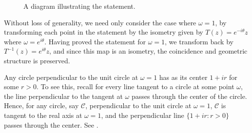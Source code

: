 \documentclass{homework}
\begin{document}
\begin{solution}
\begin{figure}[H]
\begin{center}
\end{center}
\caption{A diagram illustrating the statement.} \label{geometry_problem}
\end{figure}
\renewcommand{\CC}{\mathcal C}

Without loss of generality, we need only consider the case where $\omega = 1$, by transforming each point in the statement by the isometry given by $T(z) = e^{-i\theta} z$ where $\omega = e^{i\theta}$.  Having proved the statement for $\omega = 1$, we transform back by $T^{-1}(z) = e^{i \theta}z$, and since this map is an isometry, the coincidence and geometric structure is preserved.

Any circle perpendicular to the unit circle at $\omega = 1$ has as its center $1 + ir$ for some $r>0$.  To see this, recall for every line tangent to a circle at some point $\omega$, the line perpendicular to the tangent at $\omega$ passes through the center of the circle.  Hence, for any circle, say $\CC$, perpendicular to the unit circle at $\omega =1$, $\CC$ is tangent to the real axis at $\omega = 1$, and the perpendicular line $\{1 + ir: r>0\}$ passes through the center.  See .


\end{solution}
\end{document}
